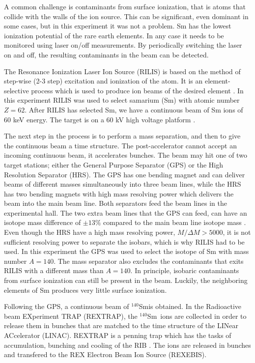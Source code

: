 \documentclass[twoside,english]{uiofysmaster/uiofysmaster}
\newcommand{\Sm}{$^{140}$Sm} %
\begin{document}
A common challenge is contaminants from surface ionization, that is atoms that collide with the walls of the ion source. 
This can be significant, even dominant in some cases, but in this experiment it was not a problem. 
Sm has the lowest ionization potential of the rare earth elements. 
In any case it needs to be monitored using laser on/off measurements. 
By periodically switching the laser on and off, the resulting contaminants in the beam can be detected.

The Resonance Ionization Laser Ion Source (RILIS) is based on the method of step-wise (2-3 step) excitation and ionization of the atom. 
It is an element-selective process which is used to produce ion beams of the desired element \cite{RILIS}. 
In this experiment RILIS was used to select samarium (Sm) with atomic number $Z = 62$. 
After RILIS has selected Sm, we have a continuous beam of Sm ions of 60 keV energy. The target is on a 60 kV high voltage platform \cite{ISOLDE-web, TIF}. 

The next step in the process is to perform a mass separation, and then to give the continuous beam a time structure. 
The post-accelerator cannot accept an incoming continuous beam, it accelerates bunches. 
The beam may hit one of two target stations; either the General Purpose Separator (GPS) or the High Resolution Separator (HRS). 
The GPS has one bending magnet and can deliver beams of different masses simultaneously into three beam lines, while the HRS has two bending magnets with high mass resolving power which delivers the beam into the main beam line. 
Both separators feed the beam lines in the experimental hall. 
The two extra beam lines that the GPS can feed, can have an isotope mass difference of $\pm 13 \%$ compared to the main beam line isotope mass \cite{GPS, TIF}.
Even though the HRS have a high mass resolving power, $M/\Delta M > 5000$, it is not sufficient resolving power to separate the isobars, which is why RILIS had to be used.
In this experiment the GPS was used to select the isotope of Sm with mass number $A = 140$. 
The mass separator also excludes the contaminants that exits RILIS with a different mass than $A = 140$.
In principle, isobaric contaminants from surface ionization can still be present in the beam.
Luckily, the neighboring elements of Sm produces very little surface ionization.

Following the GPS, a continuous beam of \Sm is obtained. 
In the Radioactive beam EXperiment TRAP (REXTRAP), the \Sm\ ions are collected in order to release them in bunches that are matched to the time structure of the LINear ACcelerator (LINAC). 
REXTRAP is a penning trap which has the tasks of accumulation, bunching and cooling of the RIB \cite{HIE-ISOLDE, REXTRAP1, REXTRAP2}. 
The ions are released in bunches and transfered to the REX Electron Beam Ion Source (REXEBIS).
\end{document}

